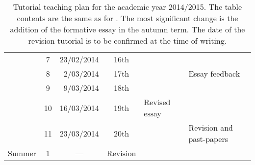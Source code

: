 \begin{table}
\begin{tabular}{c c r c l l}
			 & \hphantom{0}7 &	23/02/2014 & 16th		&			& \\
			 & \hphantom{0}8 &	 2/03/2014 & 17th		&			& Essay feedback \\
			 & \hphantom{0}9 &	 9/03/2014 & 18th		&			& \\
			 & 10		 &	16/03/2014 & 19th		& Revised essay		& \\
			 & 11		 &	23/03/2014 & 20th		&			& Revision and past-papers \\
\midrule
\multirow{1}{*}{Summer}	 & \hphantom{0}1 & \multicolumn{1}{c}{---} & Revision		&			& \\
 \bottomrule
\end{tabular}
\caption{Tutorial teaching plan for the academic year 2014/2015. The table contents are the same as for . The most significant change is the addition of the formative essay in the autumn term. The date of the revision tutorial is to be confirmed at the time of writing.}\label{tab:2014-15}
\end{table}
